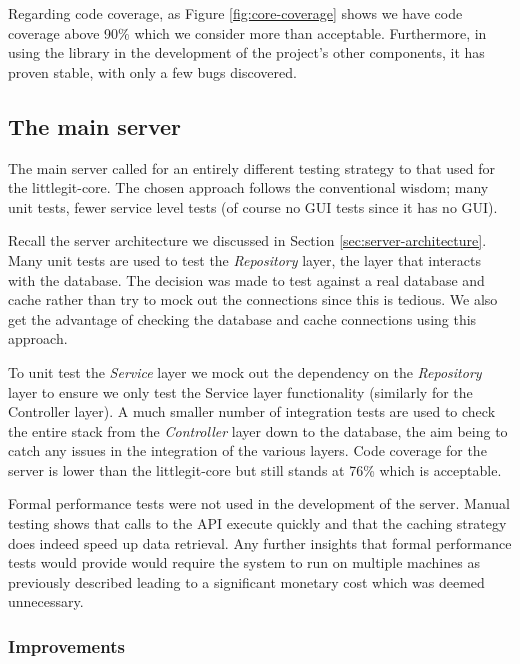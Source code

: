 Regarding code coverage, as Figure \ref{fig:core-coverage} shows we have code coverage above 90\% which we consider more than acceptable. Furthermore, in using the library in the development of the project's other components, it has proven stable, with only a few bugs discovered.


\subsection{The main server}

The main server called for an entirely different testing strategy to that used for the littlegit-core. The chosen approach follows the conventional wisdom; many unit tests, fewer service level tests (of course no GUI tests since it has no GUI).

Recall the server architecture we discussed in Section \ref{sec:server-architecture}. Many unit tests are used to test the \emph{Repository} layer, the layer that interacts with the database. The decision was made to test against a real database and cache rather than try to mock out the connections since this is tedious. We also get the advantage of checking the database and cache connections using this approach.

To unit test the \emph{Service} layer we mock out the dependency on the \emph{Repository} layer to ensure we only test the Service layer functionality (similarly for the Controller layer).  A much smaller number of integration tests are used to check the entire stack from the \emph{Controller} layer down to the database, the aim being to catch any issues in the integration of the various layers. Code coverage for the server is lower than the littlegit-core but still stands at 76\% which is acceptable.

Formal performance tests were not used in the development of the server. Manual testing shows that calls to the API execute quickly and that the caching strategy does indeed speed up data retrieval. Any further insights that formal performance tests would provide would require the system to run on multiple machines as previously described leading to a significant monetary cost which was deemed unnecessary.

\subsubsection{Improvements}

